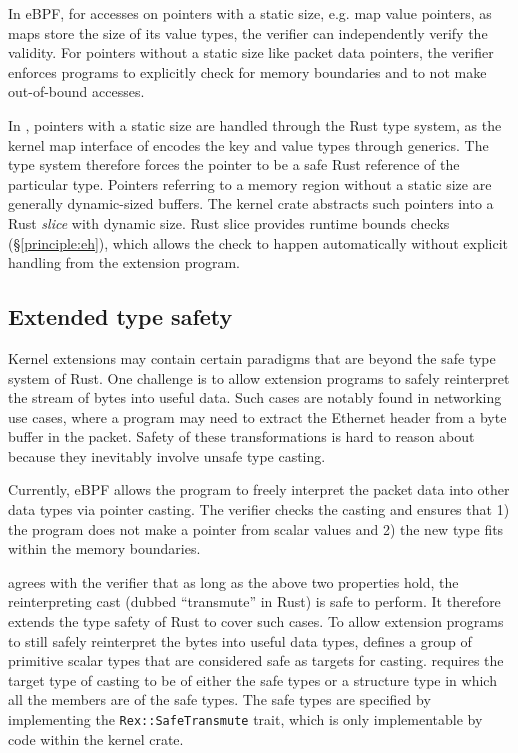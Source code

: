 In eBPF, for accesses on pointers with a static size, e.g. map value pointers,
    as maps store the size of its value types, the verifier can independently
    verify the validity.
For pointers without a static size like packet data pointers, the verifier
    enforces programs to explicitly check for memory
    boundaries and to not make out-of-bound accesses.

In \projname{}, pointers with a static size are handled through the Rust type
    system, as the
    kernel map interface of \projname{} encodes the key and value types through
    generics.
The type system therefore forces the pointer to be a safe Rust reference of
    the particular type.
Pointers referring to a memory region without a static size are generally
    dynamic-sized buffers.
The \projname{} kernel crate abstracts such pointers into a Rust \emph{slice}
    with dynamic size.
Rust slice provides runtime bounds checks (\S\ref{principle:eh}), which allows
    the check to happen automatically without explicit handling from the
    extension program.

\subsection{Extended type safety}
Kernel extensions may contain certain paradigms that are beyond the safe
    type system of Rust.
One challenge is to allow extension programs to safely reinterpret the stream
    of bytes into useful data.
Such cases are notably found in networking use cases, where a program may need
    to extract the Ethernet header from a byte buffer in the packet.
Safety of these transformations is hard to reason about because they
    inevitably involve unsafe type casting.

Currently, eBPF allows the program to freely interpret the packet data into
    other data types via pointer casting.
The verifier checks the casting and ensures that 1) the program does not make a
    pointer from scalar values and 2) the new type fits within the memory
    boundaries.

\projname{} agrees with the verifier that as long as the above two properties
    hold, the reinterpreting cast (dubbed ``transmute'' in Rust) is safe to
    perform.
It therefore extends the type safety of Rust to cover such cases.
To allow extension programs to still safely reinterpret the bytes into useful
    data types, \projname{} defines a group of primitive scalar types that are
    considered safe as targets for casting.
\projname{} requires the target type of casting to be of either the safe types
    or a structure type in which all the members are of the safe types.
The safe types are specified by implementing the \texttt{Rex::SafeTransmute}
    trait, which is only implementable by code within the kernel crate.

